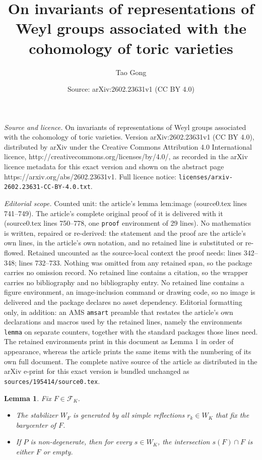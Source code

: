 \documentclass[10pt,a4paper]{amsart}
\title{On invariants of representations of Weyl groups associated with the cohomology of toric varieties}
\author{Tao Gong}
\date{Source: arXiv:2602.23631v1 (CC BY 4.0)}
\newtheorem{lemma}{Lemma}
\begin{document}
\maketitle

\noindent\emph{Source and licence.} On invariants of representations of Weyl groups associated with the cohomology of toric varieties. Version arXiv:2602.23631v1 (CC BY 4.0), distributed by arXiv under the Creative Commons Attribution 4.0 International licence, http://creativecommons.org/licenses/by/4.0/, as recorded in the arXiv licence metadata for this exact version and shown on the abstract page https://arxiv.org/abs/2602.23631v1. Full licence notice: \texttt{licenses/arxiv-2602.23631-CC-BY-4.0.txt}.\par\smallskip

\noindent\textit{Editorial scope.} Counted unit: the article's lemma lem:image (source0.tex lines 741--749). The article's complete original proof of it is delivered with it (source0.tex lines 750--778, one \texttt{proof} environment of 29 lines). No mathematics is written, repaired or re-derived: the statement and the proof are the article's own lines, in the article's own notation, and no retained line is substituted or re-flowed.  Retained uncounted as the source-local context the proof needs: lines 342--348; lines 732--733.  Nothing was omitted from any retained span, so the package carries no omission record.  No retained line contains a citation, so the wrapper carries no bibliography and no bibliography entry.  No retained line contains a figure environment, an image-inclusion command or drawing code, so no image is delivered and the package declares no asset dependency.  Editorial formatting only, in addition: an AMS \texttt{amsart} preamble that restates the article's own declarations and macros used by the retained lines, namely the environments \texttt{lemma} on separate counters, together with the standard packages those lines need.  The retained environments print in this document as Lemma 1 in order of appearance, whereas the article prints the same items with the numbering of its own full document.  The complete native source of the article as distributed in the arXiv e-print for this exact version is bundled unchanged as \texttt{sources/195414/source0.tex}.
\begin{lemma}\label{lem:stabilizer}
  Fix $F\in\mathcal{F}_K$.
  \begin{itemize}
    \item[$(1)$] The stabilizer $W_F$ is generated by all  simple reflections $r_k\in W_K$ that fix the barycenter of $F$.
    \item[$(2)$] If $P$ is non-degenerate, then for every $s \in W_K$, the intersection $s(F) \cap F$ is either $F$ or empty.
  \end{itemize}
\end{lemma}
\end{document}
